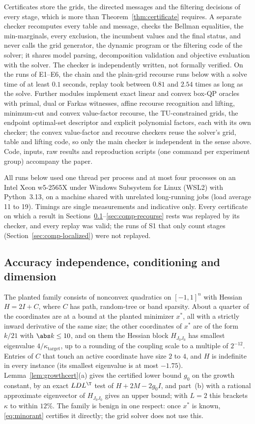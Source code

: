 Certificates store the grids, the directed messages and the filtering
decisions of every stage, which is more than Theorem~\ref{thm:certificate}
requires. A separate checker recomputes every table and message, checks the
Bellman equalities, the min-marginals, every exclusion, the incumbent values
and the final status, and never calls the grid generator, the dynamic program
or the filtering code of the solver; it shares model parsing, decomposition
validation and objective evaluation with the solver. The checker is
independently written, not formally verified. On the runs of E1--E6, the
chain and the plain-grid recourse runs below with a solve time of at least
$0.1$ seconds, replay took between $0.81$ and $2.54$ times as long as the
solve. Further modules implement exact linear and convex
box-QP oracles with
primal, dual or Farkas witnesses, affine recourse recognition and lifting,
minimum-cut and convex value-factor recourse, the TU-constrained grids, the
endpoint optimal-set descriptor and explicit polynomial factors, each with its
own checker; the convex value-factor and recourse checkers reuse the solver's
grid, table and lifting code, so only the main checker is independent in the
sense above. Code, inputs, raw results and reproduction scripts (one command
per experiment group) accompany the paper.

All runs below used one thread per process and at most four processes on an
Intel Xeon w5-2565X under Windows Subsystem for Linux (WSL2) with
Python~3.13, on a machine shared with unrelated long-running jobs (load average 11 to 19). Timings are single
measurements and indicative only. Every certificate on which a result in
Sections~\ref{sec:comp-growth}--\ref{sec:comp-recourse} rests was replayed by
its checker, and every replay was valid; the runs of S1 that only count
stages (Section~\ref{sec:comp-localized}) were not replayed.

\subsection{Accuracy independence, conditioning and dimension}
\label{sec:comp-growth}
The planted family consists of nonconvex quadratics on $[-1,1]^n$ with Hessian
$H=2I+C$, where $C$ has path, random-tree or band sparsity. About a quarter of
the coordinates are at a bound at the planted minimizer $x^*$, all with a
strictly inward derivative of the same size; the other coordinates of $x^*$
are of the form $k/21$ with $\abs k\le10$, and on them the Hessian block
$H_{J_0J_0}$ has smallest eigenvalue $4/\kappa_{\mathrm{target}}$, up to a
rounding of the coupling scale to a multiple of $2^{-12}$. Entries of $C$ that
touch an active coordinate have size $2$ to $4$, and $H$ is indefinite in
every instance (its smallest eigenvalue is at most $-1.75$).
Lemma~\ref{lem:growthcert}(a) gives the certified lower bound $g_0$ on the
growth constant, by an exact $LDL^\T$ test of $H+2M-2g_0I$, and part~(b) with
a rational approximate eigenvector of $H_{J_0J_0}$ gives an upper bound;
with $L=2$ this brackets $\kappa$ to within $12\%$. The family is benign in
one respect: once $x^*$ is known, \eqref{eq:minorant} certifies it directly;
the grid solver does not use this.

